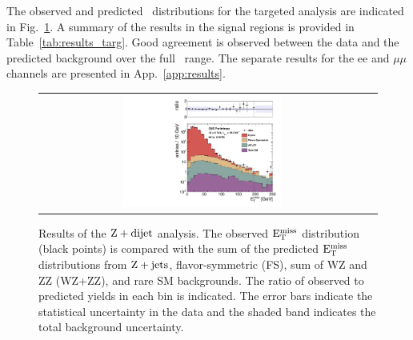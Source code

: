 \clearpage

The observed and predicted \MET\ distributions for the targeted analysis are indicated in Fig.~\ref{fig:results_targ}. 
A summary of the results in the signal regions is provided in Table~\ref{tab:results_targ}. 
Good agreement is observed between the data and the predicted background over the full \MET\ range.
The separate results for the ee and $\mu\mu$ channels are presented in App.~\ref{app:results}.

\begin{figure}[!h]
\begin{center}
\begin{tabular}{cc}
\includegraphics[width=0.5\textwidth]{plots/pfmet_bveto_all_19p5fb.pdf}
\end{tabular}
\caption{Results of the $\rm{Z}+{dijet}$ analysis. The observed $\rm{E_{T}^{miss}}$ distribution (black points) is compared with the sum of the predicted $\rm{E_{T}^{miss}}$
distributions from $\rm{Z}+\rm{jets}$, flavor-symmetric (FS), sum of WZ and ZZ (WZ+ZZ), and rare SM backgrounds. The ratio of observed to predicted yields in each bin is
indicated. The error bars indicate the statistical uncertainty in the data and the shaded band indicates the total background uncertainty.
\label{fig:results_targ}
}
\end{center}
\end{figure}



